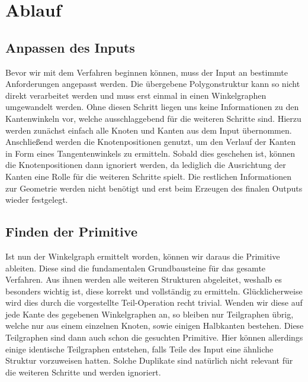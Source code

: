 
\section{Ablauf}
\subsection{Anpassen des Inputs}
Bevor wir mit dem Verfahren beginnen können, muss der Input an bestimmte Anforderungen angepasst werden. Die übergebene Polygonstruktur
kann so nicht direkt verarbeitet werden und muss erst einmal in einen Winkelgraphen umgewandelt werden. Ohne diesen Schritt liegen uns keine
Informationen zu den Kantenwinkeln vor, welche ausschlaggebend für die weiteren Schritte sind. Hierzu werden zunächst einfach alle Knoten und
Kanten aus dem Input übernommen. Anschließend werden die Knotenpositionen genutzt, um den Verlauf der Kanten in Form eines Tangentenwinkels zu
ermitteln. Sobald dies geschehen ist, können die Knotenpositionen dann ignoriert werden, da lediglich die Ausrichtung der Kanten eine Rolle
für die weiteren Schritte spielt. Die restlichen Informationen zur Geometrie werden nicht benötigt und erst beim Erzeugen des finalen Outputs
wieder festgelegt.

\subsection{Finden der Primitive}
Ist nun der Winkelgraph ermittelt worden, können wir daraus die Primitive ableiten. Diese sind die fundamentalen Grundbausteine für das
gesamte Verfahren. Aus ihnen werden alle weiteren Strukturen abgeleitet, weshalb es besonders wichtig ist, diese korrekt und vollständig zu
ermitteln. Glücklicherweise wird dies durch die vorgestellte Teil-Operation recht trivial. Wenden wir diese auf jede Kante des gegebenen
Winkelgraphen an, so bleiben nur Teilgraphen übrig, welche nur aus einem einzelnen Knoten, sowie einigen Halbkanten bestehen. Diese Teilgraphen
sind dann auch schon die gesuchten Primitive. Hier können allerdings einige identische Teilgraphen entstehen, falls Teile des Input eine ähnliche
Struktur vorzuweisen hatten. Solche Duplikate sind natürlich nicht relevant für die weiteren Schritte und werden ignoriert.

